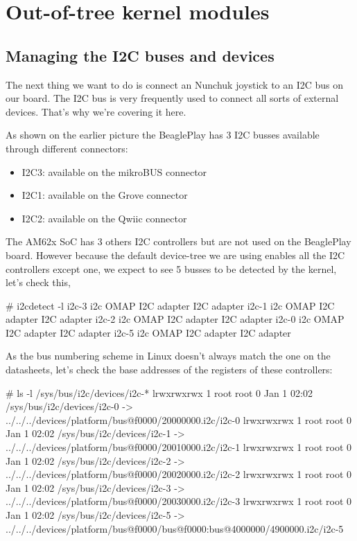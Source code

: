 \section{Out-of-tree kernel modules}
\subsection{Managing the I2C buses and devices}

The next thing we want to do is connect an Nunchuk joystick
to an I2C bus on our board. The I2C bus is very frequently used
to connect all sorts of external devices. That's why we're covering
it here.

As shown on the earlier picture the BeaglePlay has 3 I2C
busses available through different connectors:
\begin{itemize}
\item I2C3: available on the mikroBUS connector
\item I2C1: available on the Grove connector
\item I2C2: available on the Qwiic connector
\end{itemize}

The AM62x SoC has 3 others I2C controllers but are not used on
the BeaglePlay board. However because the default device-tree
we are using enables all the I2C controllers except one, we expect
to see 5 busses to be detected by the kernel, let's check this,

\begin{bashinput}
# i2cdetect -l
i2c-3	i2c       	OMAP I2C adapter                	I2C adapter
i2c-1	i2c       	OMAP I2C adapter                	I2C adapter
i2c-2	i2c       	OMAP I2C adapter                	I2C adapter
i2c-0	i2c       	OMAP I2C adapter                	I2C adapter
i2c-5	i2c       	OMAP I2C adapter                	I2C adapter
\end{bashinput}

As the bus numbering scheme in Linux doesn't always match the one
on the datasheets, let's check the base addresses of the registers
of these controllers:

\begin{bashinput}
# ls -l /sys/bus/i2c/devices/i2c-*
lrwxrwxrwx    1 root     root             0 Jan  1 02:02 /sys/bus/i2c/devices/i2c-0 -> ../../../devices/platform/bus@f0000/20000000.i2c/i2c-0
lrwxrwxrwx    1 root     root             0 Jan  1 02:02 /sys/bus/i2c/devices/i2c-1 -> ../../../devices/platform/bus@f0000/20010000.i2c/i2c-1
lrwxrwxrwx    1 root     root             0 Jan  1 02:02 /sys/bus/i2c/devices/i2c-2 -> ../../../devices/platform/bus@f0000/20020000.i2c/i2c-2
lrwxrwxrwx    1 root     root             0 Jan  1 02:02 /sys/bus/i2c/devices/i2c-3 -> ../../../devices/platform/bus@f0000/20030000.i2c/i2c-3
lrwxrwxrwx    1 root     root             0 Jan  1 02:02 /sys/bus/i2c/devices/i2c-5 -> ../../../devices/platform/bus@f0000/bus@f0000:bus@4000000/4900000.i2c/i2c-5
\end{bashinput}

